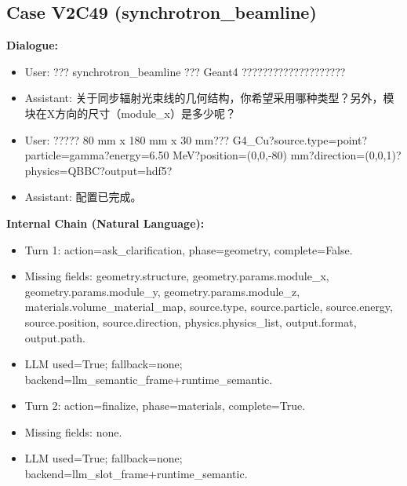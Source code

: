 \documentclass[11pt]{ctexart}
\begin{document}
\subsection{Case V2C49 (synchrotron\_beamline)}
\textbf{Dialogue:}
\begin{itemize}
\item User: ??? synchrotron\_beamline ??? Geant4 ????????????????????
\item Assistant: 关于同步辐射光束线的几何结构，你希望采用哪种类型？另外，模块在X方向的尺寸（module\_x）是多少呢？
\item User: ????? 80 mm x 180 mm x 30 mm??? G4\_Cu?source.type=point?particle=gamma?energy=6.50 MeV?position=(0,0,-80) mm?direction=(0,0,1)?physics=QBBC?output=hdf5?
\item Assistant: 配置已完成。
\end{itemize}
\textbf{Internal Chain (Natural Language):}
\begin{itemize}
\item Turn 1: action=ask\_clarification, phase=geometry, complete=False.
\item Missing fields: geometry.structure, geometry.params.module\_x, geometry.params.module\_y, geometry.params.module\_z, materials.volume\_material\_map, source.type, source.particle, source.energy, source.position, source.direction, physics.physics\_list, output.format, output.path.
\item LLM used=True; fallback=none; backend=llm\_semantic\_frame+runtime\_semantic.
\item Turn 2: action=finalize, phase=materials, complete=True.
\item Missing fields: none.
\item LLM used=True; fallback=none; backend=llm\_slot\_frame+runtime\_semantic.
\end{itemize}
\end{document}
